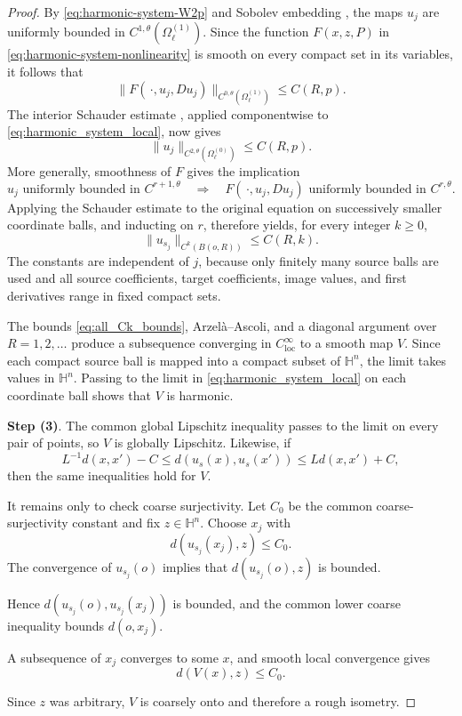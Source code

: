 \documentclass[11pt]{amsart}
\theoremstyle{plain}
\theoremstyle{plain}
\theoremstyle{plain}
\newcommand{\Hn}{\mathbb H^n}
\numberwithin{equation}{section}
\begin{document}
\begin{proof}
By \eqref{eq:harmonic-system-W2p} and Sobolev embedding
\cite[Theorem~7.26, pp.~171--172]{GilbargTrudinger}, the maps \(u_j\)
are uniformly bounded in \(C^{1,\theta}(\Omega_\ell^{(1)})\).
Since the function \(F(x,z,P)\) in
\eqref{eq:harmonic-system-nonlinearity} is smooth on every compact set in
its variables, it follows that
\[
 \bigl\|F(\,\cdot,u_j,Du_j)\bigr\|_{C^{0,\theta}(\Omega_\ell^{(1)})}
 \leq C(R,p).
\]
The interior Schauder estimate
\cite[Theorem~6.2 and its proof, pp.~91--92]{GilbargTrudinger}, applied
componentwise to \eqref{eq:harmonic_system_local}, now gives
\[
 \|u_j\|_{C^{2,\theta}(\Omega_\ell^{(0)})}
 \leq C(R,p).
\]
More generally, smoothness of \(F\) gives the implication
\[
 u_j\text{ uniformly bounded in }C^{r+1,\theta}
 \quad\Longrightarrow\quad
 F(\,\cdot,u_j,Du_j)\text{ uniformly bounded in }C^{r,\theta}.
\]
Applying the Schauder estimate to the original equation on successively
smaller coordinate balls, and inducting on \(r\), therefore yields, for
every integer \(k\geq0\),
\begin{equation}\label{eq:all_Ck_bounds}
 \|u_{s_j}\|_{C^k(B(o,R))}\leq C(R,k).
\end{equation}
The constants are independent of \(j\), because only finitely many source
balls are used and all source coefficients, target coefficients, image
values, and first derivatives range in fixed compact sets.

The bounds \eqref{eq:all_Ck_bounds}, Arzel\`a--Ascoli, and a
diagonal argument over \(R=1,2,\ldots\) produce
a subsequence converging in \(C^\infty_{\mathrm{loc}}\) to a smooth map
\(V\).  Since each compact source ball is mapped into a compact subset of
\(\Hn\), the limit takes values in \(\Hn\).  Passing to the limit in
\eqref{eq:harmonic_system_local} on each coordinate ball shows that
\(V\) is harmonic.

\textbf{Step (3)}. The common global Lipschitz inequality passes to
the limit on every pair of points, so \(V\) is globally Lipschitz.
Likewise, if
\[
L^{-1}d(x,x')-C
\leq d(u_s(x),u_s(x'))
\leq Ld(x,x')+C,
\]
then the same inequalities hold for \(V\).

It remains only to check coarse surjectivity.  Let \(C_0\) be the common
coarse-surjectivity constant and fix \(z\in\Hn\).  Choose \(x_j\) with
\[
d(u_{s_j}(x_j),z)\leq C_0.
\]
The convergence of \(u_{s_j}(o)\) implies that
\(d(u_{s_j}(o),z)\) is bounded.  

Hence \(d(u_{s_j}(o),u_{s_j}(x_j))\) is bounded, and the common lower coarse
inequality bounds \(d(o,x_j)\).  

A subsequence of \(x_j\) converges to
some \(x\), and smooth local convergence gives
\[
d(V(x),z)\leq C_0.
\]

Since \(z\) was arbitrary, \(V\) is coarsely onto and therefore a rough
isometry.
\end{proof}
\end{document}
